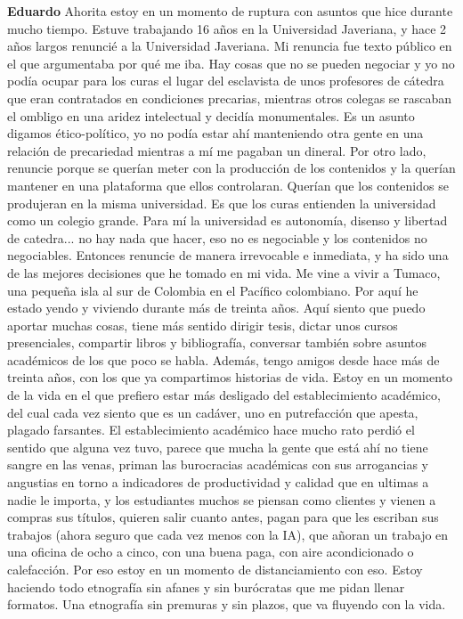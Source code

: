 \documentclass[
  spanish,
  11pt,
  a4paper,
]{scrbook}
\newenvironment{transcripcion}{
    \begin{list}{}{
        \setlength{\leftmargin}{1.5em}  %
        \setlength{\rightmargin}{0em}
        \setlength{\itemsep}{0.2em}     %
        \setlength{\parsep}{0.0em}
        \setlength{\listparindent}{0pt}
    }
}{
    \end{list}
}
\newcommand{\personaje}[1]{\textbf{#1}\quad}
\begin{document}
\begin{transcripcion}
\item \personaje{Eduardo} Ahorita estoy en un momento de ruptura con asuntos que hice durante mucho tiempo. Estuve trabajando 16 años en la Universidad Javeriana, y hace 2 años largos renuncié a la Universidad Javeriana. Mi renuncia fue texto público en el que argumentaba por qué me iba. Hay cosas que no se pueden negociar y yo no podía ocupar para los curas el lugar del esclavista de unos profesores de cátedra que eran contratados en condiciones precarias, mientras otros colegas se rascaban el ombligo en una aridez intelectual y decidía monumentales. Es un asunto digamos ético-político, yo no podía estar ahí manteniendo otra gente en una relación de precariedad mientras a mí me pagaban un dineral. Por otro lado, renuncie porque se querían meter con la producción de los contenidos y la querían mantener en una plataforma que ellos controlaran. Querían que los contenidos se produjeran en la misma universidad. Es que los curas entienden la universidad como un colegio grande. Para mí la universidad es autonomía, disenso y libertad de catedra... no hay nada que hacer, eso no es negociable y los contenidos no negociables. Entonces renuncie de manera irrevocable e inmediata, y ha sido una de las mejores decisiones que he tomado en mi vida. Me vine a vivir a Tumaco, una pequeña isla al sur de Colombia en el Pacífico colombiano. Por aquí he estado yendo y viviendo durante más de treinta años. Aquí siento que puedo aportar muchas cosas, tiene más sentido dirigir tesis, dictar unos cursos presenciales, compartir libros y bibliografía, conversar también sobre asuntos académicos de los que poco se habla. Además, tengo amigos desde hace más de treinta años, con los que ya compartimos historias de vida. Estoy en un momento de la vida en el que prefiero estar más desligado del establecimiento académico, del cual cada vez siento que es un cadáver, uno en putrefacción que apesta, plagado farsantes. El establecimiento académico hace mucho rato perdió el sentido que alguna vez tuvo, parece que mucha la gente que está ahí no tiene sangre en las venas, priman las burocracias académicas con sus arrogancias y angustias en torno a indicadores de productividad y calidad que en ultimas a nadie le importa, y los estudiantes muchos se piensan como clientes y vienen a compras sus títulos, quieren salir cuanto antes, pagan para que les escriban sus trabajos (ahora seguro que cada vez menos con la IA), que añoran un trabajo en una oficina de ocho a cinco, con una buena paga, con aire acondicionado o calefacción. Por eso estoy en un momento de distanciamiento con eso. Estoy haciendo todo etnografía sin afanes y sin burócratas que me pidan llenar formatos. Una etnografía sin premuras y sin plazos, que va fluyendo con la vida.


\end{transcripcion}
\end{document}
